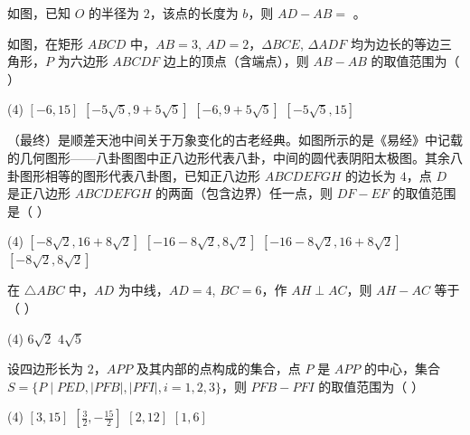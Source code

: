 \begin{example}
    如图，已知 \( O \) 的半径为 \( 2 \)，该点的长度为 \( b \)，则 \( AD - AB = \) \underline{\hspace{2cm}}。
\end{example}

\begin{example}
    如图，在矩形 \( ABCD \) 中，\( AB = 3 \), \( AD = 2 \)，\( \Delta BCE \), \( \Delta ADF \) 均为边长的等边三角形，\( P \) 为六边形 \( ABCDF \) 边上的顶点（含端点），则 \( AB - AB \) 的取值范围为（ ）
    \begin{tasks}(4)
        \task \([-6, 15]\)
        \task \([-5\sqrt{5}, 9 + 5\sqrt{5}]\)
        \task \([-6, 9 + 5\sqrt{5}]\)
        \task \([-5\sqrt{5}, 15]\)
    \end{tasks}
\end{example}

\begin{example}
    （最终）是顺差天池中间关于万象变化的古老经典。如图所示的是《易经》中记载的几何图形——八卦图图中正八边形代表八卦，中间的圆代表阴阳太极图。其余八卦图形相等的图形代表八卦图，已知正八边形 \( ABCDEFGH \) 的边长为 \( 4 \)，点 \( D \) 是正八边形 \( ABCDEFGH \) 的两面（包含边界）任一点，则 \( DF - EF \) 的取值范围是（ ）
    \begin{tasks}(4)
        \task \([-8\sqrt{2}, 16 + 8\sqrt{2}]\)
        \task \([-16 - 8\sqrt{2}, 8\sqrt{2}]\)
        \task \([-16 - 8\sqrt{2}, 16 + 8\sqrt{2}]\)
        \task \([-8\sqrt{2}, 8\sqrt{2}]\)
    \end{tasks}
\end{example}

\begin{example}
    在 \(\triangle ABC\) 中，\( AD \) 为中线，\( AD = 4 \), \( BC = 6 \)，作 \( AH \perp AC \)，则 \( AH - AC \) 等于（ ）
    \begin{tasks}(4)
        \tesk \(6\sqrt{2}\)
        \tesk \(4\sqrt{5}\)
    \end{tasks}
\end{example}

\begin{example}
    设四边形长为 \( 2 \)，\( APP \) 及其内部的点构成的集合，点 \( P \) 是 \( APP \) 的中心，集合 \( S = \{ P \mid PE D, | PFB |, | PFI |, i = 1, 2, 3 \} \)，则 \( PFB - PFI \) 的取值范围为（ ）
    \begin{tasks}(4)
        \task \([3, 15]\)
        \task \([\frac{3}{2}, -\frac{15}{2}]\)
        \task \([2, 12]\)
        \task \([1, 6]\)
    \end{tasks}
\end{example}

